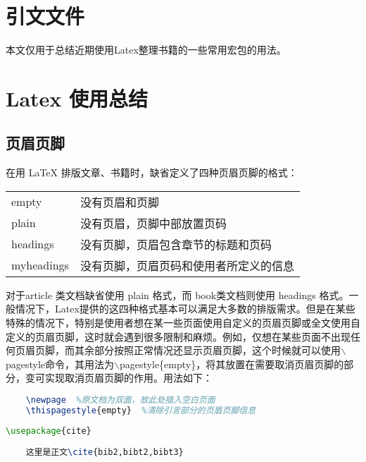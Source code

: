 \documentclass[cn,10pt,math=newtx,citestyle=gb7714-2015,bibstyle=gb7714-2015]{elegantbook}
\begin{document}
\section{引文文件}

本文仅用于总结近期使用Latex整理书籍的一些常用宏包的用法。

\section*{Latex 使用总结}

\subsection{页眉页脚}

在用 LaTeX 排版文章、书籍时，缺省定义了四种页眉页脚的格式：

\begin{table}[h]
	\centering
	\begin{tabular}{ll}
		empty      & 没有页眉和页脚              \\
		plain      & 没有页眉，页脚中部放置页码        \\
		headings   & 没有页脚，页眉包含章节的标题和页码    \\
		myheadings & 没有页脚，页眉页码和使用者所定义的信息 
	\end{tabular}
\end{table}

对于article 类文档缺省使用 plain 格式，而 book类文档则使用 headings 格式。一般情况下，Latex提供的这四种格式基本可以满足大多数的排版需求。但是在某些特殊的情况下，特别是使用者想在某一些页面使用自定义的页眉页脚或全文使用自定义的页眉页脚，这时就会遇到很多限制和麻烦。例如，仅想在某些页面不出现任何页眉页脚，而其余部分按照正常情况还显示页眉页脚，这个时候就可以使用$\backslash$pagestyle命令，其用法为$\backslash$pagestyle\{empty\}，将其放置在需要取消页眉页脚的部分，变可实现取消页眉页脚的作用。用法如下：
\begin{lstlisting}[language=tex]
	%   %引言部分
	\newpage  %原文档为双面，故此处插入空白页面
	\thispagestyle{empty}  %清除引言部分的页眉页脚信息
\end{lstlisting}
\begin{lstlisting}[language=tex]
	\usepackage{cite}
	
	这里是正文\cite{bib2,bibt2,bibt3}
\end{lstlisting}
\end{document}
